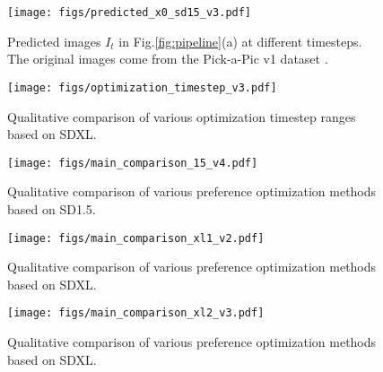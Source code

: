 \begin{figure}[ht]
    \centering
    \texttt{[image: figs/predicted\_x0\_sd15\_v3.pdf]}
    \vspace{-23pt}
    \caption{Predicted images $I_t$ in Fig.\;\ref{fig:pipeline}\;(a) at different timesteps. The original images come from the Pick-a-Pic v1 dataset \cite{pickscore}.}
    \label{fig:vis_it}
\end{figure}

\begin{figure}[t]
    \centering
    \texttt{[image: figs/optimization\_timestep\_v3.pdf]}
    \vspace{-20pt}
    \caption{Qualitative comparison of various optimization timestep ranges based on SDXL.}
    \label{fig:vis_timestep}
\end{figure}

\begin{figure}[p]
    \centering
    \vspace{-10pt}
    \texttt{[image: figs/main\_comparison\_15\_v4.pdf]}
    \vspace{-10pt}
    \caption{Qualitative comparison of various preference optimization methods based on SD1.5.}
    \label{fig:vis_15_1}
\end{figure}

\begin{figure}[p]
    \centering
    \texttt{[image: figs/main\_comparison\_xl1\_v2.pdf]}
    \vspace{-6pt}
    \caption{Qualitative comparison of various preference optimization methods based on SDXL.}
    \label{fig:vis_xl_1}
\end{figure}

\begin{figure}[p]
    \centering
    \texttt{[image: figs/main\_comparison\_xl2\_v3.pdf]}
    \vspace{-10pt}
    \caption{Qualitative comparison of various preference optimization methods based on SDXL.}
    \label{fig:vis_xl_2}
\end{figure}

